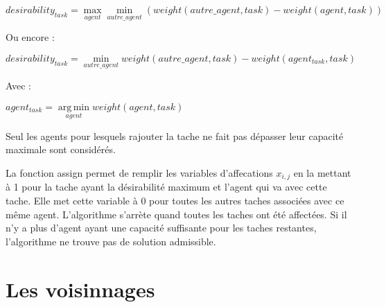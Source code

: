 \documentclass[a4paper,12pt,titlepage]{report}
\begin{document}
$desirability_{task} = \max\limits_{agent}\min\limits_{autre\_agent}(weight(autre\_agent,task) - weight(agent,task))$

Ou encore :

$desirability_{task} = \min\limits_{autre\_agent}weight(autre\_agent,task) - weight(agent_{task},task)$

Avec :

$agent_{task} = \operatorname*{arg\,min}\limits_{agent}weight(agent,task)$

Seul les agents pour lesquels rajouter la tache ne fait pas dépasser leur capacité maximale sont considérés.





La fonction assign permet de remplir les variables d'affecations $x_{i,j}$ en la mettant à 1 pour la tache ayant la désirabilité maximum et l'agent qui va avec cette tache. Elle met cette variable à 0 pour toutes les autres taches associées avec ce même agent.
L'algorithme s'arrète quand toutes les taches ont été affectées. Si il n'y a plus d'agent ayant une capacité suffisante pour les taches restantes, l'algorithme ne trouve pas de solution admissible.



\chapter{Les voisinnages}
\end{document}
